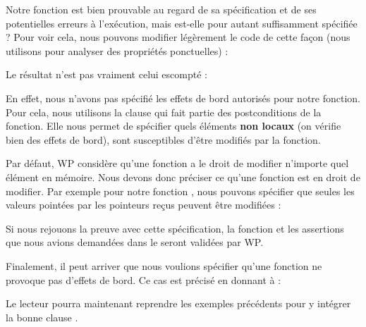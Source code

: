 Notre fonction  est bien prouvable au regard de sa spécification et
de ses potentielles erreurs à l'exécution, mais est-elle pour autant
suffisamment spécifiée ? Pour voir cela, nous pouvons modifier légèrement le code
de cette façon (nous utilisons  pour analyser des propriétés
ponctuelles) :






Le résultat n'est pas vraiment celui escompté :





En effet, nous n'avons pas spécifié les effets de bord autorisés pour notre
fonction. Pour cela, nous utilisons la clause 
qui fait partie des postconditions de la fonction. Elle nous permet de spécifier
quels éléments \textbf{non locaux} (on vérifie bien des effets de bord), sont
susceptibles d'être modifiés par la fonction.



Par défaut, WP considère qu'une fonction a le droit de modifier n'importe quel
élément en mémoire. Nous devons donc préciser ce qu'une fonction est en droit
de modifier. Par exemple pour notre fonction , nous pouvons
spécifier que seules les valeurs pointées par les pointeurs reçus peuvent être
modifiées :






Si nous rejouons la preuve avec cette spécification, la fonction et les
assertions que nous avions demandées dans le  seront validées par WP.



Finalement, il peut arriver que nous voulions spécifier qu'une fonction ne
provoque pas d'effets de bord. Ce cas est précisé en donnant 
à  :






Le lecteur pourra maintenant reprendre les exemples précédents pour y intégrer
la bonne clause .






